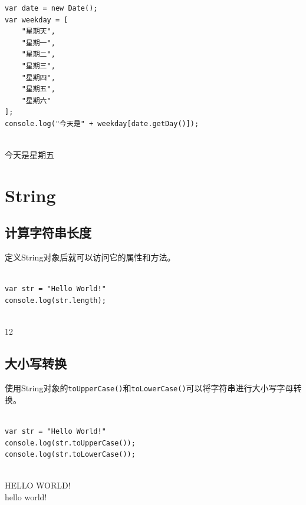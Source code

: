\begin{lstlisting}[style=htmlcssjs]
var date = new Date();
var weekday = [
    "星期天",
    "星期一",
    "星期二",
    "星期三",
    "星期四",
    "星期五",
    "星期六"
];
console.log("今天是" + weekday[date.getDay()]);
\end{lstlisting}

\begin{tcolorbox}
	 \\
	今天是星期五
\end{tcolorbox}

\newpage

\section{String}

\subsection{计算字符串长度}

定义String对象后就可以访问它的属性和方法。 \\

 \\

\begin{lstlisting}[style=htmlcssjs]
var str = "Hello World!"
console.log(str.length);
\end{lstlisting}

\begin{tcolorbox}
	 \\
	12
\end{tcolorbox}

\subsection{大小写转换}

使用String对象的\lstinline|toUpperCase()|和\lstinline|toLowerCase()|可以将字符串进行大小写字母转换。 \\

 \\

\begin{lstlisting}[style=htmlcssjs]
var str = "Hello World!"
console.log(str.toUpperCase());
console.log(str.toLowerCase());
\end{lstlisting}

\begin{tcolorbox}
	 \\
	HELLO WORLD! \\
	hello world!
\end{tcolorbox}

